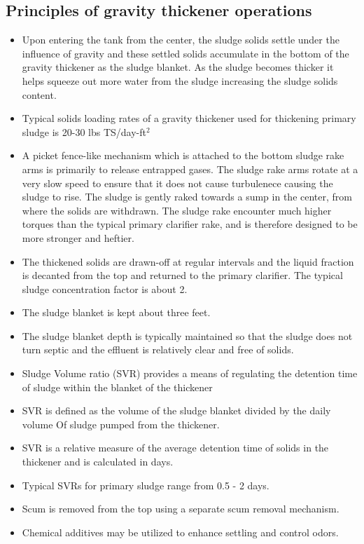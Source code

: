 \subsection{Principles of gravity thickener operations}
   
\begin{itemize}
\item Upon entering the tank from the center, the sludge solids settle under the influence of gravity and these settled solids accumulate in the bottom of the gravity thickener as the sludge blanket.  As the sludge becomes thicker it helps squeeze out more water from the sludge increasing the sludge solids content.
\item Typical solids loading rates of a gravity thickener used for thickening primary sludge is 20-30 lbs TS/day-ft$^2$
\item A picket fence-like mechanism which is attached to the bottom sludge rake arms is primarily to release entrapped gases.  The sludge rake arms rotate at a very slow speed to ensure that it does not cause turbulenece causing the sludge to rise.  The sludge is gently raked towards a sump in the center, from where the solids are withdrawn.  The sludge rake encounter much higher torques than the typical primary clarifier rake, and is therefore designed to be more stronger and heftier. 
\item The thickened solids are drawn-off at regular intervals and the liquid fraction is decanted from the top and returned to the primary clarifier.  The typical sludge concentration factor is about 2.
\item The sludge blanket is kept about three feet.  
\item The sludge blanket depth is typically maintained so that the sludge does not turn septic and the effluent is relatively clear and free of solids.  
\item Sludge Volume ratio (SVR) provides a means of regulating the detention time of sludge within the blanket of the thickener
\item SVR is defined as the volume of the sludge blanket divided by the daily volume Of sludge pumped from the thickener. 
\item SVR is a relative measure of the average detention time of solids in the thickener and is calculated in days.
\item Typical SVRs for primary sludge range from 0.5 - 2 days.
\item Scum is removed from the top using a separate scum removal mechanism.

\item Chemical additives may be utilized to enhance settling and control odors.
\end{itemize}

